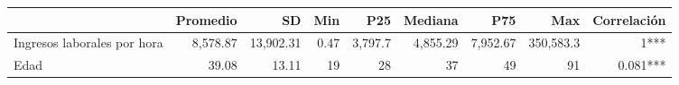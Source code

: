 \begin{table}[t]
\fontsize{12.0pt}{14.4pt}\selectfont
\begin{tabular*}{\linewidth}{@{\extracolsep{\fill}}lrrrrrrrr}
\toprule
  & Promedio & SD & Min & P25 & Mediana & P75 & Max & Correlación \\ 
\midrule\addlinespace[2.5pt]
Ingresos laborales por hora & 8,578.87 & 13,902.31 & 0.47 & 3,797.7 & 4,855.29 & 7,952.67 & 350,583.3 & 1*** \\ 
Edad & 39.08 & 13.11 & 19 & 28 & 37 & 49 & 91 & 0.081*** \\ 
\bottomrule
\end{tabular*}
\end{table}


